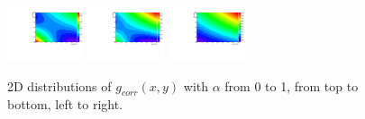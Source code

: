 \begin{figure}[thb]
\includegraphics[width=0.2\textwidth]{figures/sec-background/correlation/res_th2F_exp_th2f_res_alpha_08_n005.pdf}
\includegraphics[width=0.2\textwidth]{figures/sec-background/correlation/res_th2F_exp_th2f_res_alpha_09_n005.pdf}
\includegraphics[width=0.2\textwidth]{figures/sec-background/correlation/res_th2F_exp_th2f_res_alpha_10_n005.pdf}
  \caption{2D distributions of $g_{corr}(x,y)$ with $\alpha$ from 0 to 1, from top to bottom, left to right.}
  \label{fig:gcorr_alpha}
\end{figure}

